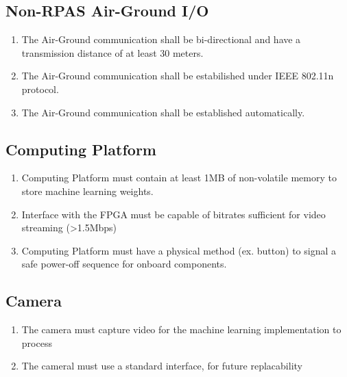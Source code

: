 \documentclass[10pt,letterpaper]{article}
\begin{document}
\subsection{Non-RPAS Air-Ground I/O}
\begin{enumerate}[label=F.CM.\arabic*, wide=1cm, widest=3cm, leftmargin=*, font=\bfseries, noitemsep,topsep=0pt, parsep=4pt, partopsep=0pt]
	\item The Air-Ground communication shall be bi-directional and have a transmission distance of at least 30 meters.
	\item The Air-Ground communication shall be estabilished under IEEE 802.11n protocol.
	\item The Air-Ground communication shall be established automatically.
\end{enumerate}

\subsection{Computing Platform}
\begin{enumerate}[label=F.CP.\arabic*, wide=1cm, widest=3cm, leftmargin=*, font=\bfseries, noitemsep,topsep=0pt, parsep=4pt, partopsep=0pt]
	\item Computing Platform must contain at least 1MB of non-volatile memory to store machine learning weights.
	\item Interface with the FPGA must be capable of bitrates sufficient for video streaming (>1.5Mbps)
	\item Computing Platform must have a physical method (ex. button) to signal a safe power-off sequence for onboard components.
\end{enumerate}

\subsection{Camera}
\begin{enumerate}[label=F.CAM.\arabic*, wide=1cm, widest=3cm, leftmargin=*, font=\bfseries, noitemsep,topsep=0pt, parsep=4pt, partopsep=0pt]
	\item The camera must capture video for the machine learning implementation to process
	\item The cameral must use a standard interface, for future replacability
\end{enumerate}
\end{document}
